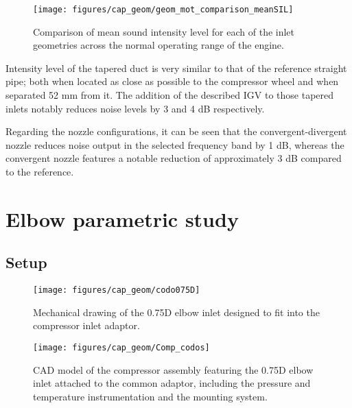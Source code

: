 \begin{figure}[h!]
\centering
\texttt{[image: figures/cap\_geom/geom\_mot\_comparison\_meanSIL]}
\caption{Comparison of mean sound intensity level for each of the inlet geometries across the normal operating range of the engine.}
\label{fig:geom_mot_comparison_meanSIL}
\end{figure}

Intensity level of the tapered duct is very similar to that of the reference straight pipe; both when located as close as possible to the compressor wheel and when separated 52 mm from it. The addition of the described IGV to those tapered inlets notably reduces noise levels by 3 and 4 dB respectively. 

Regarding the nozzle configurations, it can be seen that the convergent-divergent nozzle reduces noise output in the selected frequency band by 1 dB, whereas the convergent nozzle features a notable reduction of approximately 3 dB compared to the reference.

\section{Elbow parametric study}

\subsection{Setup}

\begin{figure}[h!]
\centering
\texttt{[image: figures/cap\_geom/codo075D]}
\caption{Mechanical drawing of the 0.75D elbow inlet designed to fit into the compressor inlet adaptor.}
\label{fig:codo075D}
\end{figure}

\begin{figure}[h!]
\centering
\texttt{[image: figures/cap\_geom/Comp\_codos]}
\caption{CAD model of the compressor assembly featuring the 0.75D elbow inlet attached to the common adaptor, including the pressure and temperature instrumentation and the mounting system.}
\label{fig:Comp_codos}
\end{figure}

